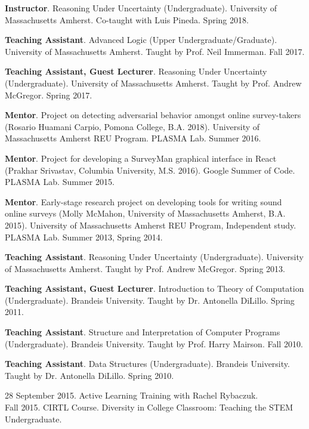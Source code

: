 \documentclass[10pt]{article}
\newcommand{\cvsec}[2]{
    \begin{tcolorbox}[width=\textwidth, breakable, title={#1}]
        #2
    \end{tcolorbox}
    \vspace{10pt}
}
\newcommand{\teaching}[6]{
  \parbox{\textwidth}{
    \textbf{#1}. #2 (#3). #4. #5. #6.
    \vspace{5pt}
  }
}
\newcommand{\umass}{University of Massachusetts Amherst}
\begin{document}
\cvsec{Teaching Experience}{
    \teaching{Instructor}
    {Reasoning Under Uncertainty}
    {Undergraduate}
    {\umass{}}{Co-taught with Luis Pineda}
    {Spring 2018}

    \teaching{Teaching Assistant}
    {Advanced Logic}
    {Upper Undergraduate/Graduate}
    {\umass{}}
    {Taught by Prof. Neil Immerman}
    {Fall 2017}

    \teaching{Teaching Assistant, Guest Lecturer}
    {Reasoning Under Uncertainty}
    {Undergraduate}
    {\umass{}}
    {Taught by Prof. Andrew McGregor}
    {Spring 2017}

    \teaching{Mentor}
    {Project on detecting adversarial behavior amongst online survey-takers}
    {Rosario Huamani Carpio, Pomona College, B.A.  2018}
    {\umass{} REU Program}
    {PLASMA Lab}
    {Summer 2016}

    \teaching{Mentor}
    {Project for developing a SurveyMan graphical interface in React}
    {Prakhar Srivastav, Columbia University, M.S. 2016}
    {Google Summer of Code}
    {PLASMA Lab}
    {Summer 2015}

    \teaching{Mentor}
    {Early-stage research project on developing tools for writing sound online surveys}
    {Molly McMahon, \umass{}, B.A. 2015}
    {\umass{} REU Program, Independent study}
    {PLASMA Lab}
    {Summer 2013, Spring 2014}

    \teaching{Teaching Assistant}
    {Reasoning Under Uncertainty}
    {Undergraduate}
    {\umass{}}
    {Taught by Prof. Andrew McGregor}
    {Spring 2013}

    \teaching{Teaching Assistant, Guest Lecturer}
    {Introduction to Theory of Computation}
    {Undergraduate}
    {Brandeis University}
    {Taught by Dr. Antonella DiLillo}
    {Spring 2011}

    \teaching{Teaching Assistant}
    {Structure and Interpretation of Computer Programs}
    {Undergraduate}
    {Brandeis University}
    {Taught by Prof. Harry Mairson}
    {Fall 2010}

    \teaching{Teaching Assistant}
    {Data Structures}
    {Undergraduate}
    {Brandeis University}
    {Taught by Dr. Antonella DiLillo}
    {Spring 2010}
  }


\cvsec{Teaching Training}{28 September 2015.  Active Learning Training with Rachel Rybaczuk.\\
Fall 2015.  CIRTL Course.  Diversity in College Classroom:  Teaching the STEM Undergraduate.
}
\end{document}
